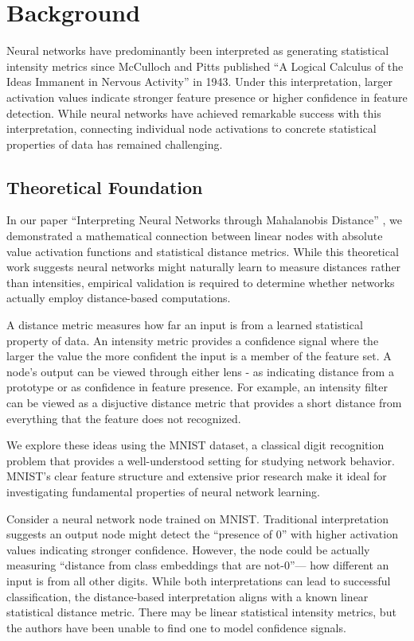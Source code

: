 \section{Background}

Neural networks have predominantly been interpreted as generating statistical intensity metrics since McCulloch and Pitts published ``A Logical Calculus of the Ideas Immanent in Nervous Activity'' in 1943. Under this interpretation, larger activation values indicate stronger feature presence or higher confidence in feature detection. While neural networks have achieved remarkable success with this interpretation, connecting individual node activations to concrete statistical properties of data has remained challenging.

\subsection{Theoretical Foundation}

In our paper ``Interpreting Neural Networks through Mahalanobis Distance'' \citep{oursland2024interpreting}, we demonstrated a mathematical connection between linear nodes with absolute value activation functions and statistical distance metrics. While this theoretical work suggests neural networks might naturally learn to measure distances rather than intensities, empirical validation is required to determine whether networks actually employ distance-based computations.

A distance metric measures how far an input is from a learned statistical property of data. An intensity metric provides a confidence signal where the larger the value the more confident the input is a member of the feature set. A node's output can be viewed through either lens - as indicating distance from a prototype or as confidence in feature presence. For example, an intensity filter can be viewed as a disjuctive distance metric that provides a short distance from everything that the feature does not recognized.

We explore these ideas using the MNIST dataset, a classical digit recognition problem that provides a well-understood setting for studying network behavior. MNIST's clear feature structure and extensive prior research make it ideal for investigating fundamental properties of neural network learning.

Consider a neural network node trained on MNIST. Traditional interpretation suggests an output node might detect the ``presence of 0'' with higher activation values indicating stronger confidence. However, the node could be actually measuring ``distance from class embeddings that are not-0''--- how different an input is from all other digits. While both interpretations can lead to successful classification, the distance-based interpretation aligns with a known linear statistical distance metric. There may be linear statistical intensity metrics, but the authors have been unable to find one to model confidence signals.

